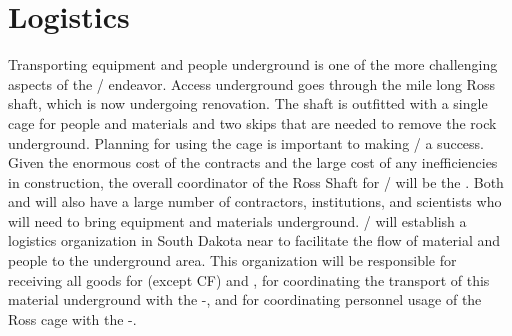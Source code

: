 \section{Logistics}
\label{sec:fdsp-tc-log}


Transporting equipment and people underground is one of the more challenging aspects of the / endeavor. Access underground goes through the mile long Ross shaft, which is now undergoing renovation. The shaft is outfitted with a single cage for people and materials and two skips that are needed to remove the rock underground. Planning for using the cage is important to making / a success. Given the enormous cost of the  contracts and the large cost of any inefficiencies in construction, the overall coordinator of the Ross Shaft for / will be the  . Both  and  will also have a large number of contractors, institutions, and scientists who will need to bring equipment and materials underground. / will establish a logistics organization in South Dakota near  to facilitate the flow of material and people to the underground area. This organization will be responsible for receiving all goods for  (except CF) and ,
for coordinating the transport of this material underground with the -, and
for coordinating personnel usage of the Ross cage with the -. 


 
